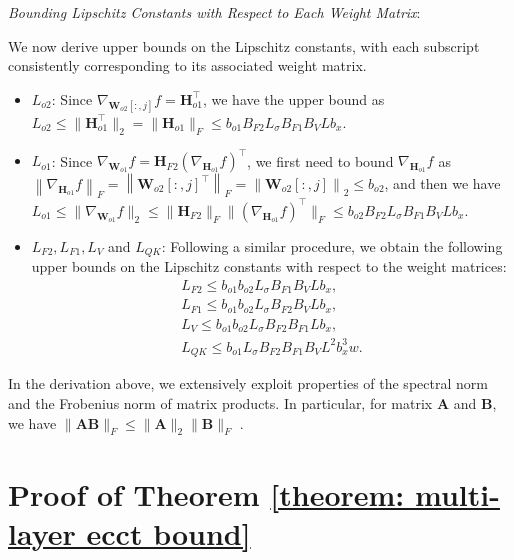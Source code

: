 \documentclass[lettersize,onecolumn]{IEEEtran}
\begin{document}
\emph{Bounding Lipschitz Constants with Respect to Each Weight Matrix}: 

We now derive upper bounds on the Lipschitz constants, with each subscript consistently corresponding to its associated weight matrix.

\begin{itemize}
    \item $L_{o2}$: Since $\nabla_{\mathbf{W}_{o2}[:,j]}f=\mathbf{H}_{o1}^{\top}$, we have the upper bound as $L_{o2} \leq \|\mathbf{H}_{o1}^{\top}\|_2=\|\mathbf{H}_{o1}\|_F \leq b_{o1}B_{F 2} L_{\sigma} B_{F 1} B_{V} L b_{x}$.
    \item $L_{o1}$: Since $\nabla_{\mathbf{W}_{o1}}f=\mathbf{H}_{F2}(\nabla_{\mathbf{H}_{o1}}f)^{\top}$, we first need to bound $\nabla_{\mathbf{H}_{o1}}f$ as $\left\|\nabla_{\mathbf{H}_{o1}}f\right\|_{F}=\left\|\mathbf{W}_{o2}[:,j]^{\top}\right\|_{F}=\left\|\mathbf{W}_{o2}[:,j]\right\|_{2} \leq b_{o 2}$, and then we have $L_{o1} \leq \| \nabla_{\mathbf{W}_{o1}}f \|_2 \leq \|\mathbf{H}_{F2}\|_F \|(\nabla_{\mathbf{H}_{o1}}f)^{\top}\|_F \leq b_{o2}B_{F 2} L_{\sigma} B_{F 1} B_{V} L b_{x}$.
    \item $L_{F2}, L_{F1}, L_{V}$ and $L_{QK}$: Following a similar procedure, we obtain the following upper bounds on the Lipschitz constants with respect to the weight matrices:
    \begin{gather}
        L_{F2}  \leq b_{o1}b_{o2} L_{\sigma} B_{F 1} B_{V} L b_{x}, \\
        L_{F1} \leq b_{o1}b_{o2} L_{\sigma} B_{F 2} B_{V} L b_{x}, \\
        L_{V} \leq b_{o1}b_{o2} L_{\sigma} B_{F 2} B_{F 1} L b_{x}, \\
        L_{QK} \leq b_{o1} L_{\sigma} B_{F 2} B_{F 1} B_{V} L^2 b_{x}^{3}w. \label{eq: L_QK bound (dense)}
    \end{gather}
\end{itemize}

In the derivation above, we extensively exploit properties of the spectral norm and the Frobenius norm of matrix products. In particular, for matrix $\mathbf{A}$ and $\mathbf{B}$, we have $\|\mathbf{A}\mathbf{B}\|_F\leq \|\mathbf{A}\|_2 \|\mathbf{B}\|_F$ .

\section{Proof of Theorem \ref{theorem: multi-layer ecct bound}}
\end{document}
